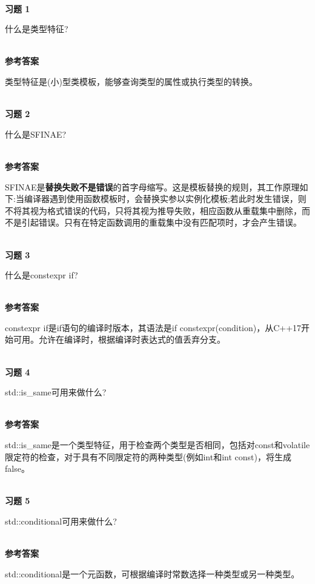 \hspace*{\fill} \\ %
\noindent
\textbf{习题 1}

什么是类型特征?

\hspace*{\fill} \\ %
\noindent
\textbf{参考答案}

类型特征是(小)型类模板，能够查询类型的属性或执行类型的转换。


\hspace*{\fill} \\ %
\noindent
\textbf{习题 2}

什么是SFINAE?

\hspace*{\fill} \\ %
\noindent
\textbf{参考答案}

SFINAE是\textbf{替换失败不是错误}的首字母缩写。这是模板替换的规则，其工作原理如下:当编译器遇到使用函数模板时，会替换实参以实例化模板;若此时发生错误，则不将其视为格式错误的代码，只将其视为推导失败，相应函数从重载集中删除，而不是引起错误。只有在特定函数调用的重载集中没有匹配项时，才会产生错误。

\hspace*{\fill} \\ %
\noindent
\textbf{习题 3}

什么是constexpr if?

\hspace*{\fill} \\ %
\noindent
\textbf{参考答案}

constexpr if是if语句的编译时版本，其语法是if constexpr(condition)，从C++17开始可用。允许在编译时，根据编译时表达式的值丢弃分支。

\hspace*{\fill} \\ %
\noindent
\textbf{习题 4}

std::is\_same可用来做什么?

\hspace*{\fill} \\ %
\noindent
\textbf{参考答案}

std::is\_same是一个类型特征，用于检查两个类型是否相同，包括对const和volatile限定符的检查，对于具有不同限定符的两种类型(例如int和int const)，将生成false。

\hspace*{\fill} \\ %
\noindent
\textbf{习题 5}

std::conditional可用来做什么?

\hspace*{\fill} \\ %
\noindent
\textbf{参考答案}

std::conditional是一个元函数，可根据编译时常数选择一种类型或另一种类型。












